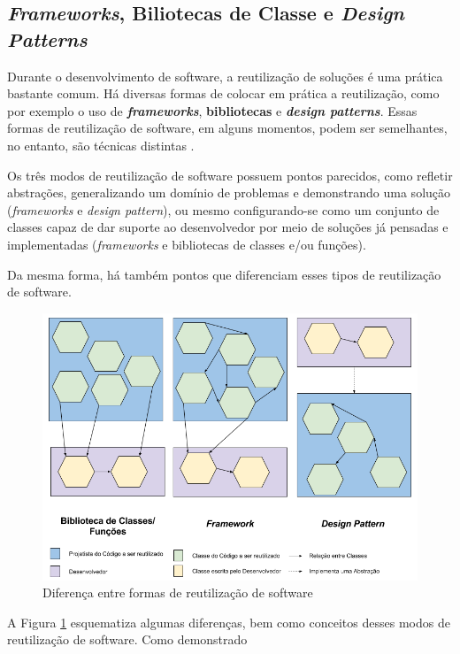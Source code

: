 \subsection{\textit{Frameworks}, Biliotecas de Classe e \textit{Design Patterns}}
Durante o desenvolvimento de software, a reutilização de soluções é uma prática
bastante comum. Há diversas formas de colocar em prática a reutilização, como
por exemplo o uso de \textbf{\textit{frameworks}}, \textbf{bibliotecas} e
\textbf{\textit{design patterns}}. Essas formas de reutilização de software, em
alguns momentos, podem ser semelhantes, no entanto, são técnicas distintas
\cite{barretoJunior2006}.
\par
\indent Os três modos de reutilização de software possuem pontos parecidos,
como refletir abstrações, generalizando um domínio de problemas e demonstrando
uma solução (\textit{frameworks} e \textit{design pattern}), ou mesmo
configurando-se como um conjunto de classes capaz de dar suporte ao
desenvolvedor por meio de soluções já pensadas e implementadas
(\textit{frameworks} e bibliotecas de classes e/ou funções).
\par
\indent Da mesma forma, há também pontos que diferenciam esses tipos de
reutilização de software.
  \begin{figure}[h]
    \centering
    \includegraphics[width=\textwidth]{figuras/bibFrameworkDesignPattern.png}
    \caption{Diferença entre formas de reutilização de software}
    \label{fig:bibFrameworkPattern}
  \end{figure}
\par
\indent A Figura \ref{fig:bibFrameworkPattern} esquematiza algumas diferenças,
bem como conceitos desses modos de reutilização de software. Como demonstrado
